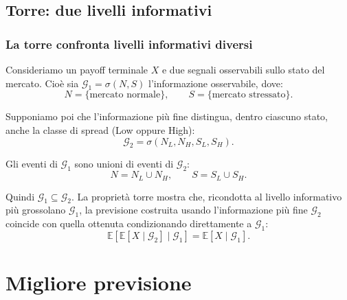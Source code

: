 \documentclass[handout]{beamer}%
\providecommand{\E}{\mathbb{E}}
\providecommand{\G}{\mathcal{G}}
\providecommand{\1}{\mathbf{1}}
\providecommand{\QTR}[2]{\csname #1\endcsname{#2}}
\begin{document}


\subsection{Torre: due livelli informativi}%

\begin{frame}%
%

\frametitle{La torre confronta livelli informativi diversi}%
%

%


Consideriamo un payoff terminale $X$ e due segnali osservabili sullo stato del
mercato. Cio\`{e} sia $\mathcal{G}_{1}=\sigma(N,S)$ l'informazione
osservabile, dove:
\[
N=\{\text{mercato normale}\}, \qquad S=\{\text{mercato stressato}\}.
\]


\medskip

Supponiamo poi che l'informazione pi\`{u} fine distingua, dentro ciascuno
stato, anche la classe di spread (Low oppure High):
\[
\mathcal{G}_{2}= \sigma(N_{L},N_{H},S_{L},S_{H}).
\]


Gli eventi di $\mathcal{G}_{1}$ sono unioni di eventi di $\mathcal{G}_{2}$:
\[
N=N_{L}\cup N_{H}, \qquad S=S_{L}\cup S_{H}.
\]


Quindi $\mathcal{G}_{1}\subseteq\mathcal{G}_{2}$. La propriet\`{a} torre
mostra che, ricondotta al livello informativo pi\`{u} grossolano $\G_{1}$, la
previsione costruita usando l'informazione pi\`{u} fine $\G_{2}$ coincide con
quella ottenuta condizionando direttamente a $\G_{1}$:
\[
\E[\E[X\mid\G_2]\mid\G_1]=\E[X\mid\G_1].
\]
%

\transboxout
\end{frame}%


\section{Migliore previsione}
\end{document}
